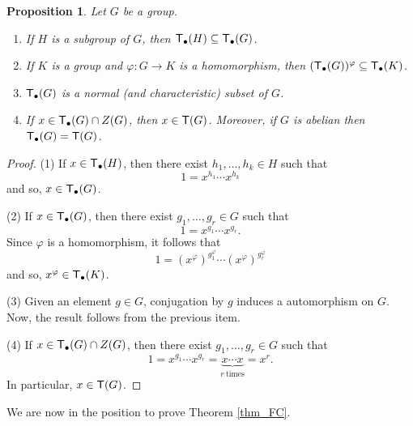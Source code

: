 \documentclass[12pt,leqno]{amsart}
\newcommand{\T}{{\sf T}}
\newcommand{\Tg}{{\sf T_{\bullet}}}
\newtheorem{prop}[theorem]{\sc Proposition}
\theoremstyle{definition}
\begin{document}
\begin{prop} \label{prop_basic}
 Let $G$ be a group. 
\begin{enumerate}
    \item If $H$ is a subgroup of $G$, then $\Tg(H) \subseteq \Tg(G)$.
    \item If $K$ is a group and $\varphi \colon G \to K$ is a homomorphism, then $(\Tg(G))^{\varphi} \subseteq \Tg(K)$. 
    \item $\Tg(G)$ is a normal (and characteristic) subset of $G$.  
   \item If $x  \in \Tg(G) \cap Z(G)$, then $x \in \T (G)$. Moreover, if $G$ is abelian then $\Tg(G) = \T (G)$.  
        
\end{enumerate} 
\end{prop}
\begin{proof}
(1) If $x \in \Tg(H)$, then there exist $h_1, \ldots, h_k \in H$ such that $$1 = x^{h_1} \cdots x^{h_k}$$ and so, $x \in \Tg(G)$.

(2) If $x \in \Tg(G)$, then there exist $g_1, \ldots, g_r \in G$ such that $$ 1 = x^{g_1} \cdots x^{g_r}.$$ Since $\varphi$ is a homomorphism, it follows that $$ 1 = (x^{\varphi})^{g_1^{\varphi}} \cdots (x^{\varphi})^{g_r^{\varphi}} $$ and so, $x^{\varphi} \in \Tg(K)$. 

(3) Given an element $g\in G$, conjugation by $g$ induces a automorphism on $G$. Now, the result follows from the previous item. 

(4) If $x \in \Tg(G) \cap Z(G)$, then there exist $g_1, \ldots, g_r \in G$ such that $$ 1 = x^{g_1} \cdots x^{g_r} = \underbrace{x \cdots x}_{r \ \textrm{times} } = x^r.$$ In particular, $x \in \T (G)$. 
\end{proof}

We are now in the position to prove Theorem \ref{thm_FC}. 
\end{document}
